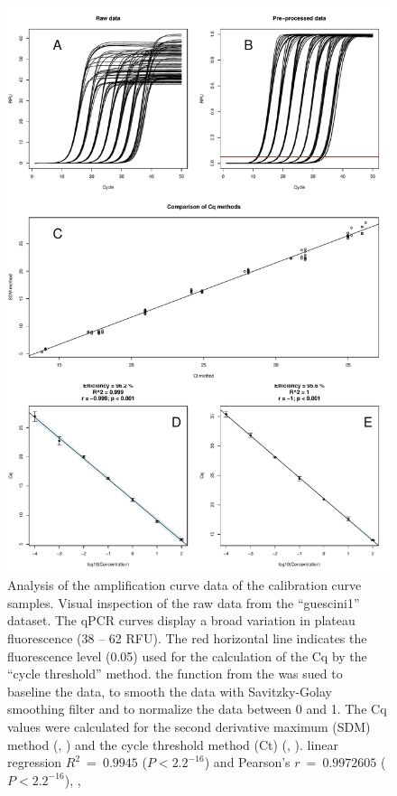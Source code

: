\begin{figure}[htbp]
  \centering
  \includegraphics[clip=true, width=14cm]{figures/dilution_Cq.pdf}
  \caption{Analysis of the amplification curve data of the calibration curve 
samples.  Visual inspection of the raw data from the ``guescini1'' 
dataset. The qPCR curves display a broad variation in plateau fluorescence (38 
-- 62 RFU). The red horizontal line indicates the fluorescence level (0.05) used 
for the calculation of the Cq by the ``cycle threshold'' method.  
the  function from the  was sued to baseline the 
data, to smooth the data with Savitzky-Golay smoothing filter and to normalize 
the data between 0 and 1.  The Cq values were calculated for the 
second derivative maximum (SDM) method (, ) and the 
cycle threshold method (Ct) (, ). linear 
regression $R^{2}~=~0.9945$ ($P < 2.2^{-16}$) and Pearson's $r~=~0.9972605$ ($P 
< 2.2^{-16}$), , } 
  \label{figure:dilution_Cq}
\end{figure}

